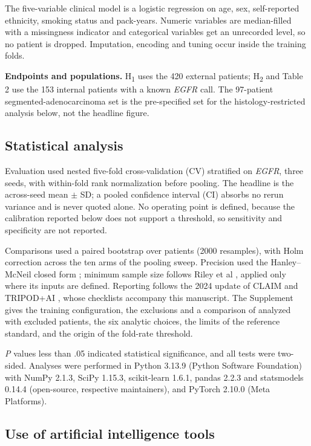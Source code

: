 \documentclass[11pt]{article}
\begin{document}
The five-variable clinical model is a logistic regression on age, sex,
self-reported ethnicity, smoking status and pack-years. Numeric variables are
median-filled with a missingness indicator and categorical variables get an
unrecorded level, so no patient is dropped. Imputation, encoding and tuning occur
inside the training folds.

\textbf{Endpoints and populations.} H\textsubscript{1} uses the 420 external
patients; H\textsubscript{2} and Table 2 use the 153 internal patients with a known
\textit{EGFR} call. The 97-patient segmented-adenocarcinoma set is the
pre-specified set for the histology-restricted analysis below, not the headline
figure.

\subsection*{Statistical analysis}

Evaluation used nested five-fold cross-validation (CV) stratified on
\textit{EGFR}, three seeds, with within-fold rank normalization before pooling.
The headline is the across-seed mean $\pm$ SD; a pooled confidence interval (CI)
absorbs no rerun variance and is never quoted alone. No operating point is
defined, because the calibration reported below does not support a threshold, so
sensitivity and specificity are not reported.

Comparisons used a paired bootstrap over patients (2000 resamples), with Holm
correction across the ten arms of the pooling sweep. Precision used the
Hanley--McNeil closed form \citep{hanley1982}; minimum sample size follows Riley
et al \citep{riley2020}, applied only where its inputs are defined. Reporting follows the 2024 update of CLAIM \citep{claim2024} and TRIPOD+AI
\citep{tripodai}, whose checklists accompany this manuscript. The Supplement gives
the training configuration, the exclusions and a comparison of analyzed with
excluded patients, the six analytic choices, the limits of the reference standard,
and the origin of the fold-rate threshold.

\textit{P} values less than .05 indicated statistical significance, and all tests
were two-sided. Analyses were performed in Python 3.13.9 (Python Software
Foundation) with NumPy 2.1.3, SciPy 1.15.3, scikit-learn 1.6.1, pandas 2.2.3 and
statsmodels 0.14.4 (open-source, respective maintainers), and PyTorch 2.10.0
(Meta Platforms).

\subsection*{Use of artificial intelligence tools}
\end{document}
